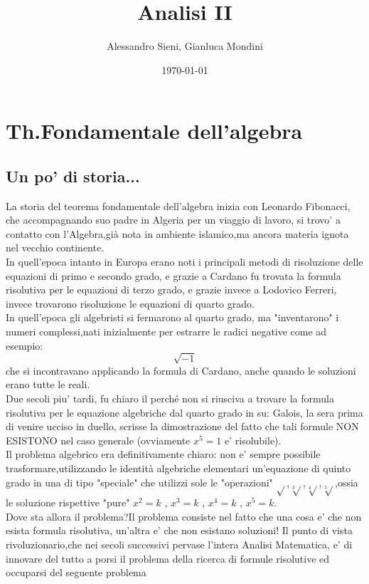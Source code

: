\documentclass[fontsize = 20px, paper = a4]{article}
\author{Alessandro Sieni, Gianluca Mondini}
\title{Analisi II}
\date{\today}
\begin{document}
\maketitle
\newpage
\tableofcontents
\newpage


\section{Th.Fondamentale dell'algebra}
\subsection{Un po' di storia...}
La storia del teorema fondamentale dell'algebra inizia con Leonardo Fibonacci, che accompagnando suo padre in Algeria per un viaggio di lavoro, si trovo' a contatto con l'Algebra,già nota in ambiente islamico,ma ancora materia ignota nel vecchio continente.\\
In quell'epoca intanto in Europa erano noti i principali metodi di risoluzione delle equazioni di primo e secondo grado, e grazie a Cardano fu trovata la formula risolutiva per le equazioni di terzo grado, e grazie invece a Lodovico Ferreri, invece trovarono risoluzione le equazioni di quarto grado.\\
In quell'epoca gli algebristi si fermarono al quarto grado, ma "inventarono" i numeri complessi,nati inizialmente per estrarre le radici negative come ad esempio: $$\sqrt{-1}$$
che si incontravano applicando la formula di Cardano, anche quando le soluzioni erano tutte le reali.\\
Due secoli piu' tardi, fu chiaro il perché non si riusciva a trovare la formula risolutiva per le equazione algebriche dal quarto grado in su: Galois, la sera prima di venire ucciso in duello, scrisse la dimostrazione del fatto che tali formule NON ESISTONO nel caso generale (ovviamente $x^5 = 1$ e' risolubile).\\
Il problema algebrico era definitivamente chiaro: non e' sempre possibile trasformare,utilizzando le identità algebriche elementari un'equazione di quinto grado in una di tipo "speciale" che utilizzi sole le "operazioni"
$\sqrt{}$,$\sqrt[3]{}$,$\sqrt[4]{}$,$\sqrt[5]{}$,ossia le soluzione rispettive "pure" $x^2 = k$ , $x^3 = k$ , $x^4 = k$ , $x^5 = k$.\\
Dove sta allora il problema?Il problema consiste nel fatto che una cosa e' che non esista formula risolutiva, un'altra e' che non esistano soluzioni! Il punto di vista rivoluzionario,che nei secoli successivi pervase l'intera  
Analisi Matematica, e' di innovare del tutto a porsi il problema della ricerca di formule risolutive ed occuparsi del seguente problema\\ \\
\end{document}
